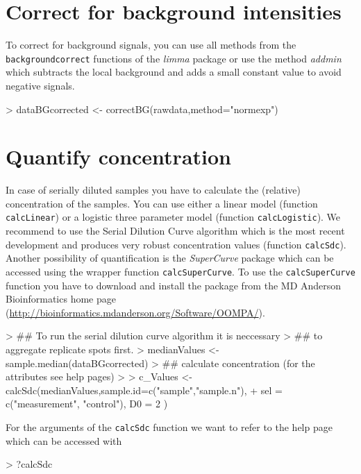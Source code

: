\documentclass[12pt]{article}
\newcommand{\Rfunction}[1]{{\texttt{#1}}}
\newcommand{\Rfunarg}[1]{{\textit{#1}}}
\begin{document}
\section{Correct for background intensities}

To correct for background signals, you can use all methods from the \Rfunction{backgroundcorrect}
functions of the \emph{limma} package \citep{limma} or use the method \Rfunarg{addmin} which subtracts the local background and adds a small constant value to avoid negative signals.

\begin{Schunk}
\begin{Sinput}
> dataBGcorrected <- correctBG(rawdata,method="normexp")
\end{Sinput}
\end{Schunk}

\section{Quantify concentration}

In case of serially diluted samples you have to calculate the (relative) concentration 
of the samples. You can use either a linear model (function \Rfunction{calcLinear}) or a logistic three parameter model (function \Rfunction{calcLogistic}). We recommend to use the Serial Dilution Curve algorithm \cite{Zhang:2009p812} which is the most recent development and produces very robust concentration values (function \Rfunction{calcSdc}). Another possibility of quantification is the \emph{SuperCurve} package \citep{supercurve} which can be accessed using the wrapper function \Rfunction{calcSuperCurve}. 
To use the  \Rfunction{calcSuperCurve} function you have to download and install the package from the MD Anderson Bioinformatics home page (\url{http://bioinformatics.mdanderson.org/Software/OOMPA/}).

\begin{Schunk}
\begin{Sinput}
> ## To run the serial dilution curve algorithm it is neccessary
> ## to aggregate replicate spots first.
> medianValues <- sample.median(dataBGcorrected)
> ## calculate concentration (for the attributes see help pages)
> 
> c_Values <- calcSdc(medianValues,sample.id=c("sample","sample.n"), 
+                     sel = c("measurement", "control"), D0 = 2 )
\end{Sinput}
\end{Schunk}
For the arguments of the \Rfunction{calcSdc} function we want to refer to the help page which can be accessed with
\begin{Schunk}
\begin{Sinput}
> ?calcSdc
\end{Sinput}
\end{Schunk}
\end{document}
